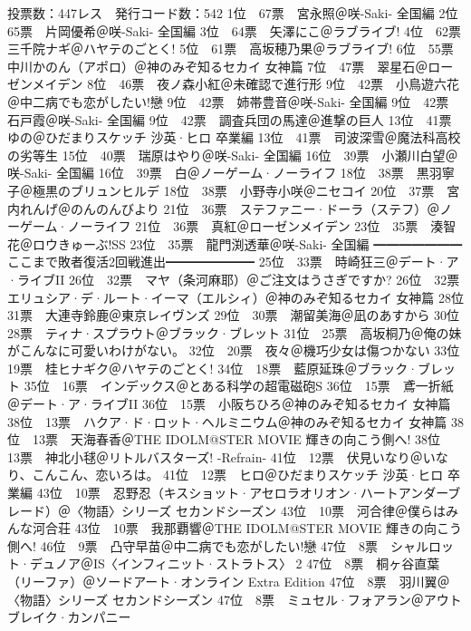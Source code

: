     投票数：447レス　発行コード数：542
    1位　67票　宮永照＠咲-Saki- 全国編
    2位　65票　片岡優希＠咲-Saki- 全国編
    3位　64票　矢澤にこ＠ラブライブ!
    4位　62票　三千院ナギ＠ハヤテのごとく!
    5位　61票　高坂穂乃果＠ラブライブ!
    6位　55票　中川かのん（アポロ）＠神のみぞ知るセカイ 女神篇
    7位　47票　翠星石＠ローゼンメイデン
    8位　46票　夜ノ森小紅＠未確認で進行形
    9位　42票　小鳥遊六花＠中二病でも恋がしたい!戀
    9位　42票　姉帯豊音＠咲-Saki- 全国編
    9位　42票　石戸霞＠咲-Saki- 全国編
    9位　42票　調査兵団の馬達＠進撃の巨人
    13位　41票　ゆの＠ひだまりスケッチ 沙英·ヒロ 卒業編
    13位　41票　司波深雪＠魔法科高校の劣等生
    15位　40票　瑞原はやり＠咲-Saki- 全国編
    16位　39票　小瀬川白望＠咲-Saki- 全国編
    16位　39票　白＠ノーゲーム·ノーライフ
    18位　38票　黒羽寧子＠極黒のブリュンヒルデ
    18位　38票　小野寺小咲＠ニセコイ
    20位　37票　宮内れんげ＠のんのんびより
    21位　36票　ステファニー·ドーラ（ステフ）＠ノーゲーム·ノーライフ
    21位　36票　真紅＠ローゼンメイデン
    23位　35票　湊智花＠ロウきゅーぶ!SS
    23位　35票　龍門渕透華＠咲-Saki- 全国編
    ━━━━━━━ここまで敗者復活2回戦進出━━━━━━━
    25位　33票　時崎狂三＠デート·ア·ライブII
    26位　32票　マヤ（条河麻耶）＠ご注文はうさぎですか?
    26位　32票　エリュシア·デ·ルート·イーマ（エルシィ）＠神のみぞ知るセカイ 女神篇
    28位　31票　大連寺鈴鹿＠東京レイヴンズ
    29位　30票　潮留美海＠凪のあすから
    30位　28票　ティナ·スプラウト＠ブラック·ブレット
    31位　25票　高坂桐乃＠俺の妹がこんなに可愛いわけがない。
    32位　20票　夜々＠機巧少女は傷つかない
    33位　19票　桂ヒナギク＠ハヤテのごとく!
    34位　18票　藍原延珠＠ブラック·ブレット
    35位　16票　インデックス＠とある科学の超電磁砲S
    36位　15票　鳶一折紙＠デート·ア·ライブII
    36位　15票　小阪ちひろ＠神のみぞ知るセカイ 女神篇
    38位　13票　ハクア·ド·ロット·ヘルミニウム＠神のみぞ知るセカイ 女神篇
    38位　13票　天海春香＠THE IDOLM@STER MOVIE 輝きの向こう側へ!
    38位　13票　神北小毬＠リトルバスターズ! -Refrain-
    41位　12票　伏見いなり＠いなり、こんこん、恋いろは。
    41位　12票　ヒロ＠ひだまりスケッチ 沙英·ヒロ 卒業編
    43位　10票　忍野忍（キスショット·アセロラオリオン·ハートアンダーブレード）＠〈物語〉シリーズ セカンドシーズン
    43位　10票　河合律＠僕らはみんな河合荘
    43位　10票　我那覇響＠THE IDOLM@STER MOVIE 輝きの向こう側へ!
    46位　9票　凸守早苗＠中二病でも恋がしたい!戀
    47位　8票　シャルロット·デュノア＠IS〈インフィニット·ストラトス〉 2
    47位　8票　桐ヶ谷直葉（リーファ）＠ソードアート·オンライン Extra Edition
    47位　8票　羽川翼＠〈物語〉シリーズ セカンドシーズン
    47位　8票　ミュセル·フォアラン＠アウトブレイク·カンパニー
